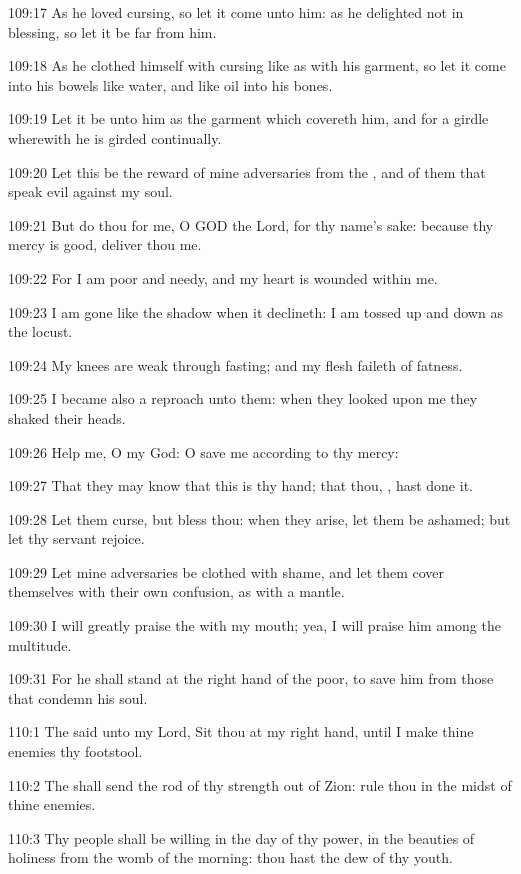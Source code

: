 109:17 As he loved cursing, so let it come unto him: as he delighted not in blessing, so let it be far from him.

109:18 As he clothed himself with cursing like as with his garment, so let it come into his bowels like water, and like oil into his bones.

109:19 Let it be unto him as the garment which covereth him, and for a girdle wherewith he is girded continually.

109:20 Let this be the reward of mine adversaries from the \LORD, and of them that speak evil against my soul.

109:21 But do thou for me, O GOD the Lord, for thy name's sake: because thy mercy is good, deliver thou me.

109:22 For I am poor and needy, and my heart is wounded within me.

109:23 I am gone like the shadow when it declineth: I am tossed up and down as the locust.

109:24 My knees are weak through fasting; and my flesh faileth of fatness.

109:25 I became also a reproach unto them: when they looked upon me they shaked their heads.

109:26 Help me, O \LORD my God: O save me according to thy mercy:

109:27 That they may know that this is thy hand; that thou, \LORD, hast done it.

109:28 Let them curse, but bless thou: when they arise, let them be ashamed; but let thy servant rejoice.

109:29 Let mine adversaries be clothed with shame, and let them cover themselves with their own confusion, as with a mantle.

109:30 I will greatly praise the \LORD with my mouth; yea, I will praise him among the multitude.

109:31 For he shall stand at the right hand of the poor, to save him from those that condemn his soul.



110:1 The \LORD said unto my Lord, Sit thou at my right hand, until I make thine enemies thy footstool.

110:2 The \LORD shall send the rod of thy strength out of Zion: rule thou in the midst of thine enemies.

110:3 Thy people shall be willing in the day of thy power, in the beauties of holiness from the womb of the morning: thou hast the dew of thy youth.

